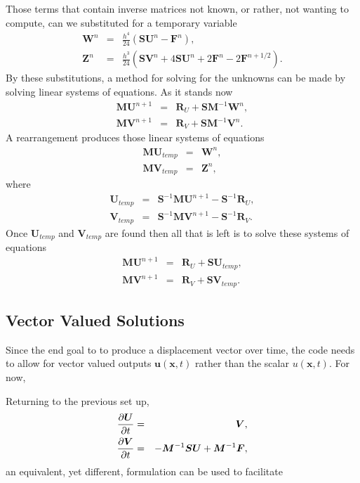 Those terms that contain inverse matrices not known, or rather, not wanting to compute, can we substituted for a temporary variable
\begin{eqnarray*}
  \bm{W}^n & = & \frac{h^4}{24}(\bm{SU}^n - \bm{F}^n), \\
  \bm{Z}^n & = & \frac{h^3}{24}(\bm{SV}^n + 4\bm{SU}^n + 2\bm{F}^n - 2\bm{F}^{n+1/2}).
\end{eqnarray*}
By these substitutions, a method for solving for the unknowns can be made by solving linear systems of equations. As it stands now
\begin{eqnarray*}
  \bm{MU}^{n+1} & = & \bm{R}_U + \bm{SM}^{-1}\bm{W}^n, \\
  \bm{MV}^{n+1} & = & \bm{R}_V + \bm{SM}^{-1}\bm{V}^n.
\end{eqnarray*}
A rearrangement produces those linear systems of equations
\begin{eqnarray*}
  \bm{M}\bm{U}_{temp} & = & \bm{W}^n, \\
  \bm{M}\bm{V}_{temp} & = & \bm{Z}^n,
\end{eqnarray*}
where
\begin{eqnarray*}
  \bm{U}_{temp} & = & \bm{S}^{-1}\bm{MU}^{n+1} - \bm{S}^{-1}\bm{R}_U, \\
  \bm{V}_{temp} & = & \bm{S}^{-1}\bm{MV}^{n+1} - \bm{S}^{-1}\bm{R}_V.
\end{eqnarray*}
Once $\bm{U}_{temp}$ and $\bm{V}_{temp}$ are found then all that is left is to solve these systems of equations
\begin{eqnarray*}
  \bm{MU}^{n+1} & = & \bm{R}_U + \bm{SU}_{temp}, \\
  \bm{MV}^{n+1} & = & \bm{R}_V + \bm{SV}_{temp}.
\end{eqnarray*}

\subsection{Vector Valued Solutions}
Since the end goal to to produce a displacement vector over time, the code needs to allow for vector valued outputs $\bm{u}(\bm{x},t)$ rather than the scalar $u(\bm{x},t)$. For now,

Returning to the previous set up,
\begin{eqnarray*}
  \frac{\partial\bm{U}}{\partial t} & = & \bm{V}, \\
  \frac{\partial\bm{V}}{\partial t} & = & -\bm{M}^{-1}\bm{SU} + \bm{M}^{-1}\bm{F},
\end{eqnarray*}
an equivalent, yet different, formulation can be used to facilitate
